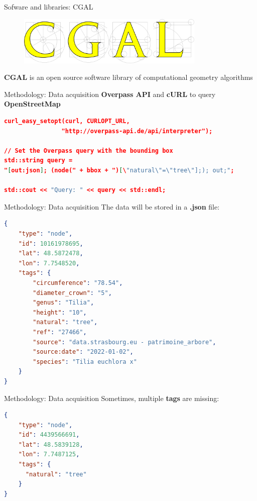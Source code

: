 \documentclass[12pt]{beamer}
\begin{document}
\begin{frame}{Sofware and libraries: CGAL}
  \begin{figure}[H]
      \centering
      \includegraphics[width=0.8\textwidth]{images/cgal_logo.png}
  \end{figure}
  \begin{center}
  \textbf{CGAL} is an open source software library of computational geometry algorithms
  \end{center}
\end{frame}

\begin{frame}[fragile]{Methodology: Data acquisition}
  \textbf{Overpass API} and \textbf{cURL} to query
  \textbf{OpenStreetMap}
  \begin{lstlisting}[language=json]
curl_easy_setopt(curl, CURLOPT_URL,
                "http://overpass-api.de/api/interpreter");

// Set the Overpass query with the bounding box
std::string query =
"[out:json]; (node(" + bbox + ")[\"natural\"=\"tree\"];); out;";

std::cout << "Query: " << query << std::endl;
  \end{lstlisting}
\end{frame}


\begin{frame}[fragile]{Methodology: Data acquisition}
The data will be stored in a \textbf{.json} file:

\begin{lstlisting}[language=json]
{
    "type": "node",
    "id": 10161978695,
    "lat": 48.5872478,
    "lon": 7.7548520,
    "tags": {
        "circumference": "78.54",
        "diameter_crown": "5",
        "genus": "Tilia",
        "height": "10",
        "natural": "tree",
        "ref": "27466",
        "source": "data.strasbourg.eu - patrimoine_arbore",
        "source:date": "2022-01-02",
        "species": "Tilia euchlora x"
    }
}
\end{lstlisting}
\end{frame}

\begin{frame}[fragile]{Methodology: Data acquisition}
Sometimes, multiple \textbf{tags} are missing:

\begin{lstlisting}[language=json]
{
    "type": "node",
    "id": 4439566691,
    "lat": 48.5839128,
    "lon": 7.7487125,
    "tags": {
      "natural": "tree"
    }
}
\end{lstlisting}
\end{frame}
\end{document}
